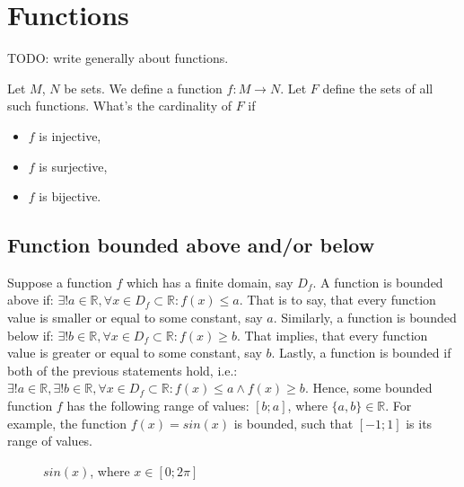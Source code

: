 \documentclass[10pt,a4paper]{article}
\begin{document}

\section{Functions}

TODO: write generally about functions.

Let $M$, $N$ be sets. We define a function \(f: M \to N\). Let $F$ define the
sets of all such functions. What's the cardinality of $F$ if

\begin{itemize}
  \item $f$ is injective,
  \item $f$ is surjective,
  \item $f$ is bijective.
\end{itemize}

\subsection{Function bounded above and/or below}


Suppose a function $f$ which has a finite domain, say $D_f$. A function is bounded above if:
$\exists! a \in \mathbb{R}, \forall x \in D_f \subset \mathbb{R}: f(x) \leq a$. That is to say,
that every function value is smaller or equal to some constant, say $a$. Similarly, a function
is bounded below if: $\exists! b \in \mathbb{R}, \forall x \in D_f \subset \mathbb{R}: f(x) 
\geq b$. That implies, that every function value is greater or equal to some constant, say $b$.
Lastly, a function is bounded if both of the previous statements hold, i.e.:
$\exists! a \in \mathbb{R}, \exists! b \in \mathbb{R}, \forall x \in D_f \subset \mathbb{R}:
f(x) \leq a \land f(x) \geq b$. Hence, some bounded function $f$ has the following range of 
values: $[b;a]$, where $\{a,b\} \in \mathbb{R}$. For example, the function $f(x) = sin(x)$ 
is bounded, such that $[-1;1]$ is its range of values. \\

\begin{figure}[htp]
    \begin{center}  %
    \end{center}

    \caption{$sin(x)$, where $x \in [0;2 \pi]$}
\end{figure}
\end{document}
